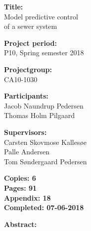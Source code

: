 \begin{minipage}[t]{0.48\textwidth}
\textbf{Title:} \\[5pt]\hspace*{2ex}
Model predictive control   \\\hspace*{2ex}
of a sewer system \\\hspace*{2ex}

\textbf{Project period:} \\[5pt]\bigskip\hspace{2ex}
P10, Spring semester 2018

\textbf{Projectgroup:} \\[5pt]\bigskip\hspace{2ex}
CA10-1030

\textbf{Participants:} \\[5pt]\hspace*{2ex}
Jacob Naundrup Pedersen \\\hspace*{2ex}
Thomas Holm Pilgaard \\\hspace*{2ex}


\textbf{Supervisors:} \\[5pt]\hspace*{2ex}
Carsten Skovmose Kallesøe \\\hspace*{2ex}
Palle Andersen \\ \hspace*{2ex} %
Tom Søndergaard Pedersen \\\hspace*{2ex}


\vspace*{3.0cm}

\textbf{Copies: 6} \\
\textbf{Pages: 91}\\
\textbf{Appendix: 18}\\
\textbf{Completed: 07-06-2018}\\

\end{minipage}
\hfill
\begin{minipage}[t]{0.483\textwidth}
\textbf{Abstract:} \\[5pt]
\fbox{\parbox{7cm}{\bigskip\bigskip}}
\end{minipage}

\vfill

{\footnotesize\itshape}





